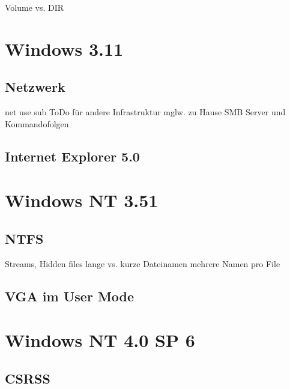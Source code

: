 		Volume vs. DIR

\section{Windows 3.11}

	\subsection{Netzwerk}

	net use sub 
	ToDo für andere Infrastruktur mglw. zu Hause SMB Server und Kommandofolgen

	\subsection{Internet Explorer 5.0}

\section{Windows NT 3.51}

	\subsection{NTFS}
	Streams, Hidden files
	lange vs. kurze Dateinamen
	mehrere Namen pro File

	\subsection{VGA im User Mode}

\section{Windows NT 4.0 SP 6}

	\subsection{CSRSS}
